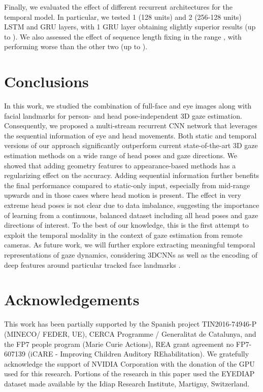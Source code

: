 \documentclass{bmvc2k}
\begin{document}
Finally, we evaluated the effect of different recurrent architectures for the temporal model. In particular, we tested 1 (128 units) and 2 (256-128 units) LSTM and GRU layers, with 1 GRU layer obtaining slightly superior results (up to ). We also assessed the effect of sequence length fixing  in the range , with  performing worse than the other two (up to ). 

\section{Conclusions}
\label{sec:conclusions}


In this work, we studied the combination of full-face and eye images along with facial landmarks for person- and head pose-independent 3D gaze estimation. Consequently, we proposed a multi-stream recurrent CNN network that leverages the sequential information of eye and head movements. Both static and temporal versions of our approach significantly outperform current state-of-the-art 3D gaze estimation methods on a wide range of head poses and gaze directions. We showed that adding geometry features to appearance-based methods has a regularizing effect on the accuracy. Adding sequential information further benefits the final performance compared to static-only input, especially from mid-range upwards and in those cases where head motion is present. The effect in very extreme head poses is not clear due to data imbalance, suggesting the importance of learning from a continuous, balanced dataset including all head poses and gaze directions of interest. To the best of our knowledge, this is the first attempt to exploit the temporal modality in the context of gaze estimation from remote cameras. As future work, we will further explore extracting meaningful temporal representations of gaze dynamics, considering 3DCNNs as well as the encoding of deep features around particular tracked face landmarks \cite{jung2015joint}.

\section*{Acknowledgements}
This work has been partially supported by the Spanish project TIN2016-74946-P (MINECO/ FEDER, UE), CERCA Programme / Generalitat de Catalunya, and the FP7 people program (Marie Curie Actions), REA grant agreement no FP7-607139 (iCARE - Improving Children Auditory REhabilitation). We gratefully acknowledge the support of NVIDIA Corporation with the donation of the GPU used for this research. Portions of the research in this paper used the EYEDIAP dataset made available by the Idiap Research Institute, Martigny, Switzerland.



\end{document}
